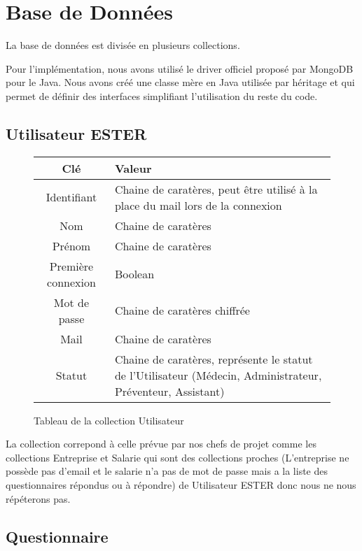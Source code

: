 \section{Base de Données}

La base de données est divisée en plusieurs collections.

Pour l'implémentation, nous avons utilisé le driver officiel proposé par MongoDB pour le Java. Nous avons créé une classe mère en Java utilisée par héritage et qui permet de définir des interfaces simplifiant l'utilisation du reste du code.

\subsection{Utilisateur ESTER}

\begin{figure}[H]
    \begin{center}
        \begin{tabularx}{17cm}{|c|X|}
            \hline
            Clé & Valeur  \tabularnewline 
            \hline
            Identifiant & 
            Chaine de caratères, peut être utilisé à la place du mail lors de la connexion \tabularnewline 
            Nom & 
            Chaine de caratères \tabularnewline
            Prénom & 
            Chaine de caratères \tabularnewline
            Première connexion & 
            Boolean \tabularnewline
            Mot de passe & 
            Chaine de caratères chiffrée \tabularnewline
            Mail & 
            Chaine de caratères \tabularnewline
            Statut & 
            Chaine de caratères, représente le statut de l'Utilisateur (Médecin, Administrateur,
            Préventeur, Assistant) \tabularnewline
            \hline
        \end{tabularx}
    \end{center}
    \caption{Tableau de la collection Utilisateur}
\end{figure}

La collection correpond à celle prévue par nos chefs de projet comme
les collections Entreprise et Salarie qui sont des collections proches (L'entreprise ne possède 
pas d'email et le salarie n'a pas de mot de passe mais a la liste des questionnaires répondus ou à répondre) de Utilisateur ESTER donc nous ne nous répéterons pas. 


\subsection{Questionnaire}


